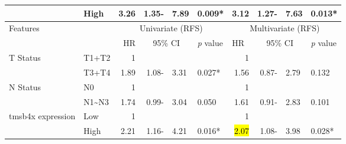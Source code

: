 \documentclass[
paper=landscape,
paper=160mm:90mm, %
fontsize=11pt, %
pagesize, %
parskip=half-, %
]{scrartcl} %
\theoremstyle{mythmstyle} %
\begin{document}
{\begin{table}[H]
{\begin{tabular}{ll|rlll|rlll}
                    & High                  & 3.26 & \multicolumn{1}{r}{1.35-} & 7.89 & \textcolor[rgb]{1,0.149,0}{0.009* } & 3.12                   & \multicolumn{1}{r}{1.27-} & 7.63 & \textcolor[rgb]{1,0.149,0}{0.013* }  \\ 
\hline\hline
\multicolumn{2}{l}{Features}                & \multicolumn{4}{c}{Univariate (RFS)}                                          & \multicolumn{4}{c}{Multivariate (RFS)}                                                           \\ 
\hline
                    & \multicolumn{1}{l}{}  & HR   & \multicolumn{2}{c}{95\% CI}      & \multicolumn{1}{l}{\textit{p} value}         & \multicolumn{1}{l}{HR} & \multicolumn{2}{c}{95\% CI}      & \textit{p} value                              \\ 
\hline
T Status            & T1+T2                 & 1    &                           &      &                                     & 1                      &                           &      &                                      \\
                    & T3+T4                 & 1.89 & \multicolumn{1}{r}{1.08-} & 3.31 & \textcolor[rgb]{1,0.149,0}{0.027* } & 1.56                   & \multicolumn{1}{r}{0.87-} & 2.79 & 0.132                                \\
N Status            & N0                    & 1    &                           &      &                                     & 1                      &                           &      &                                      \\
                    & N1\textasciitilde{}N3 & 1.74 & \multicolumn{1}{r}{0.99-} & 3.04 & 0.050                               & 1.61                   & \multicolumn{1}{r}{0.91-} & 2.83 & 0.101                                \\
\acrshort{tmsb4x} expression   & Low                   & 1    &                           &      &                                     & 1                      &                           &      &                                      \\
                    & High                  & 2.21 & \multicolumn{1}{r}{1.16-} & 4.21 & \textcolor[rgb]{1,0.149,0}{0.016* } & \hl{2.07}                   & \multicolumn{1}{r}{1.08-} & 3.98 & \textcolor[rgb]{1,0.149,0}{0.028* }  \\ 
\hline

\end{tabular}}
\end{table}}
\end{document}
